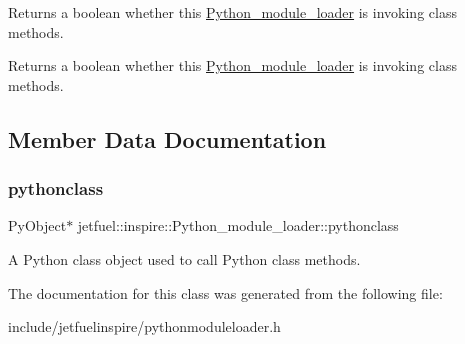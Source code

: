 Returns a boolean whether this \hyperlink{classjetfuel_1_1inspire_1_1Python__module__loader}{Python\+\_\+module\+\_\+loader} is invoking class methods. 

Returns a boolean whether this \hyperlink{classjetfuel_1_1inspire_1_1Python__module__loader}{Python\+\_\+module\+\_\+loader} is invoking class methods. 

\subsection{Member Data Documentation}
\mbox{\label{classjetfuel_1_1inspire_1_1Python__module__loader_a973a8f86d446820b38b18f87fe51465a}} 
\subsubsection{\texorpdfstring{pythonclass}{pythonclass}}
{\footnotesize\ttfamily Py\+Object$\ast$ jetfuel\+::inspire\+::\+Python\+\_\+module\+\_\+loader\+::pythonclass\hspace{0.3cm}{\ttfamily [protected]}}

A Python class object used to call Python class methods. 

The documentation for this class was generated from the following file\+:\begin{DoxyCompactItemize}
\item 
include/jetfuelinspire/pythonmoduleloader.\+h\end{DoxyCompactItemize}
